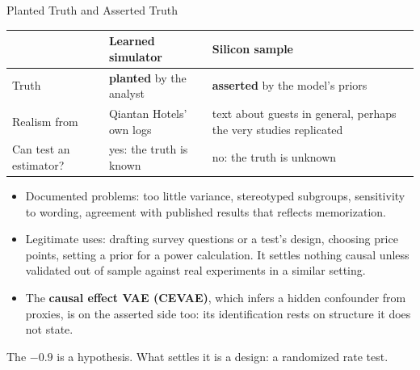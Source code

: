 \documentclass[aspectratio=169, 11pt, handout]{beamer}
\begin{document}
\begin{frame}{Planted Truth and Asserted Truth}

\begin{center}
\small
\begin{tabular}{p{2.6cm}p{5.0cm}p{5.0cm}}
\toprule
& \textbf{Learned simulator} & \textbf{Silicon sample} \\
\midrule
Truth & \textbf{planted} by the analyst & \textbf{asserted} by the model's priors \\
Realism from & Qiantan Hotels' own logs & text about guests in general, perhaps the very studies replicated \\
Can test an estimator? & yes: the truth is known & no: the truth is unknown \\
\bottomrule
\end{tabular}
\end{center}

\medskip

\begin{itemize}
  \item Documented problems: too little variance, stereotyped subgroups, sensitivity to wording, agreement with published results that reflects memorization.
  \item Legitimate uses: drafting survey questions or a test's design, choosing price points, setting a prior for a power calculation. It settles nothing causal unless validated out of sample against real experiments in a similar setting.
  \item The \textbf{causal effect VAE (CEVAE)}, which infers a hidden confounder from proxies, is on the asserted side too: its identification rests on structure it does not state.
\end{itemize}

The $-0.9$ is a hypothesis. What settles it is a design: a randomized rate test.
\end{frame}
\end{document}
